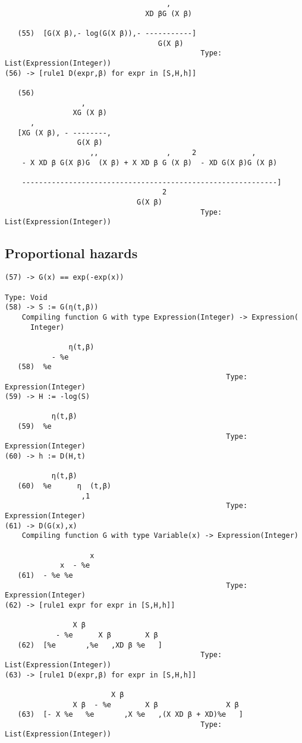 \documentclass[11pt]{article}
\begin{document}
\begin{verbatim}
                                      ,
                                 XD βG (X β)

   (55)  [G(X β),- log(G(X β)),- -----------]
                                    G(X β)
                                              Type: List(Expression(Integer))
(56) -> [rule1 D(expr,β) for expr in [S,H,h]]
 
   (56)
                  ,
                XG (X β)
      ,
   [XG (X β), - --------,
                 G(X β)
                    ,,                ,     2             ,
    - X XD β G(X β)G  (X β) + X XD β G (X β)  - XD G(X β)G (X β)

    ------------------------------------------------------------]
                                     2
                               G(X β)
                                              Type: List(Expression(Integer))
\end{verbatim}

\subsection{Proportional hazards}
\label{sec:orgheadline2}
\begin{verbatim}
(57) -> G(x) == exp(-exp(x))
                                                                   Type: Void
(58) -> S := G(η(t,β))
    Compiling function G with type Expression(Integer) -> Expression(
      Integer) 

               η(t,β)
           - %e
   (58)  %e
                                                    Type: Expression(Integer)
(59) -> H := -log(S)
 
           η(t,β)
   (59)  %e
                                                    Type: Expression(Integer)
(60) -> h := D(H,t)
 
           η(t,β)
   (60)  %e      η  (t,β)
                  ,1
                                                    Type: Expression(Integer)
(61) -> D(G(x),x)
    Compiling function G with type Variable(x) -> Expression(Integer) 

                    x
             x  - %e
   (61)  - %e %e
                                                    Type: Expression(Integer)
(62) -> [rule1 expr for expr in [S,H,h]]
 
                X β
            - %e      X β        X β
   (62)  [%e       ,%e   ,XD β %e   ]
                                              Type: List(Expression(Integer))
(63) -> [rule1 D(expr,β) for expr in [S,H,h]]
 
                         X β
                X β  - %e        X β                X β
   (63)  [- X %e   %e       ,X %e   ,(X XD β + XD)%e   ]
                                              Type: List(Expression(Integer))
\end{verbatim}
\end{document}
